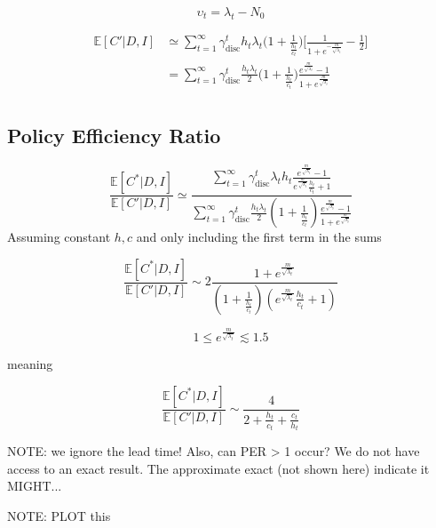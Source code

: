 \begin{equation}
	\upsilon_t= \lambda_t-N_0
\end{equation}

\begin{equation}
	\begin{split}
		\mathbb{E}[C'|D,I] &\simeq \sum_{t=1}^{\infty} \gamma_{\text{disc}}^{t} h_t\lambda_t 
		\bigg(1+\frac{1}{\frac{h_t}{c_t}}\bigg)\bigg[\frac{1}{1+e^{-\frac{m}{\sqrt{\lambda_t}}}}- \frac{1}{2}\bigg]\\
		&= \sum_{t=1}^{\infty} \gamma_{\text{disc}}^{t} \frac{h_t\lambda_t}{2} 
		\bigg(1+\frac{1}{\frac{h_t}{c_t}}\bigg)\frac{e^{\frac{m}{\sqrt{\lambda_t}}}-1}{1+e^{\frac{m}{\sqrt{\lambda_t}}}}\\
	\end{split}
\end{equation}


\subsection{Policy Efficiency Ratio}

\begin{equation}
	\frac{\mathbb{E}[C^*|D,I] }{\mathbb{E}[C'|D,I]}\simeq \frac{\sum_{t=1}^{\infty} \gamma_{\text{disc}}^{t} \lambda_th_t\frac{e^{\frac{m}{\sqrt{\lambda_t}}}-1}{e^{\frac{m}{\sqrt{\lambda_t}}}\frac{h_t}{c_t}+1}}{\sum_{t=1}^{\infty} \gamma_{\text{disc}}^{t} \frac{h_t\lambda_t}{2} 
		(1+\frac{1}{\frac{h_t}{c_t}})\frac{e^{\frac{m}{\sqrt{\lambda_t}}}-1}{1+e^{\frac{m}{\sqrt{\lambda_t}}}}}
\end{equation}
Assuming constant $h,c$ and only including the first term in the sums

\begin{equation}
	\frac{\mathbb{E}[C^*|D,I] }{\mathbb{E}[C'|D,I]}\sim 2\frac{1+e^{\frac{m}{\sqrt{\lambda_t}}}}{ 
		(1+\frac{1}{\frac{h_t}{c_t}})(e^{\frac{m}{\sqrt{\lambda_t}}}\frac{h_t}{c_t}+1)}
\end{equation}

\begin{equation}
	1\leq e^{\frac{m}{\sqrt{\lambda_t}}}\lesssim 1.5
\end{equation}

meaning

\begin{equation}
	\frac{\mathbb{E}[C^*|D,I] }{\mathbb{E}[C'|D,I]}\sim \frac{4}{2+\frac{h_t}{c_t}+\frac{c_t}{h_t}}
\end{equation}

{\color{red} NOTE: we ignore the lead time! Also, can PER > 1 occur? We do not have access to an exact result. The approximate exact (not shown here) indicate it MIGHT...}


{\color{red} NOTE: PLOT this}

